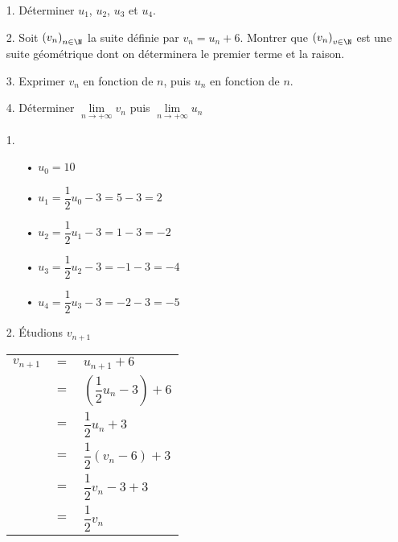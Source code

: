\begin{itemize}
\item[1.] Déterminer $u_1$, $u_2$, $u_3$ et $u_4$. 
\item[2.] Soit $\left(v_n\right)_{n \in \N}$ la suite définie par $v_n = u_n + 6$. Montrer que $\left(v_n\right)_{v \in \N}$ est une suite géométrique dont on déterminera le premier terme et la raison. 
\item[3.] Exprimer $v_n$ en fonction de $n$, puis $u_n$ en fonction de $n$. 
\item[4.]  Déterminer $\lim\limits_{n \to +\infty} v_n$ puis $\lim\limits_{n \to +\infty} u_n$ \\
\end{itemize}

\begin{itemize}
\item[1.]
\begin{itemize}
\item[•] $u_0 = 10$ \\
\item[•] $u_1 = \dfrac{1}{2} u_0 - 3 = 5 - 3 = 2$ \\
\item[•] $u_2 = \dfrac{1}{2} u_1 - 3 = 1 - 3 = -2$ \\
\item[•] $u_3 = \dfrac{1}{2} u_2 - 3 = -1 - 3 = -4$ \\
\item[•] $u_4 = \dfrac{1}{2} u_3 - 3 = -2 - 3 = -5$ \\
\end{itemize}
\item[2.] Étudions $v_{n+1}$ \\
\begin{tabular}{lll}
$v_{n+1}$ & $=$ & $u_{n+1} + 6$ \vspace*{.3cm} \\
& $=$ & $\left(\dfrac{1}{2}u_n - 3\right)+6$ \vspace*{.3cm} \\
& $=$ & $\dfrac{1}{2}u_n + 3$ \vspace*{.3cm} \\
& $=$ & $\dfrac{1}{2} \left(v_n - 6\right) + 3$ \vspace*{.3cm} \\
& $=$ & $\dfrac{1}{2} v_n - 3 + 3$ \vspace*{.3cm} \\
& $=$ & $\dfrac{1}{2} v_n$ \\
\end{tabular}
\vspace*{.3cm}


\end{itemize}

